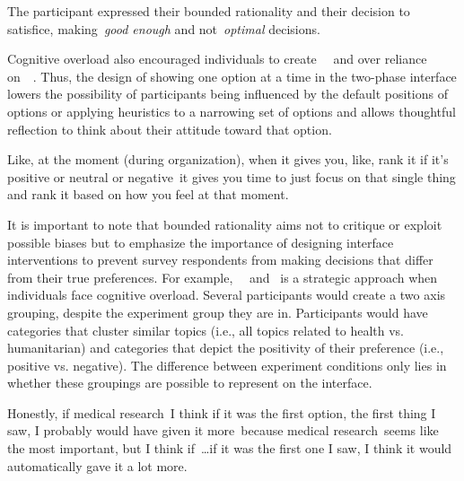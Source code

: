 The participant expressed their bounded rationality and their decision to satisfice, making~\textit{good enough} and not~\textit{optimal} decisions.

Cognitive overload also encouraged individuals to create~\underline{}~\cite{tverskyJudgmentUncertaintyHeuristics1974} and over reliance on~\underline{}~\cite{thalerNudgeImprovingDecisions2008a}. Thus, the design of showing one option at a time in the two-phase interface lowers the possibility of participants being influenced by the default positions of options or applying heuristics to a narrowing set of options and allows thoughtful reflection to think about their attitude toward that option.

\begin{displayquote}
Like, at the moment (during organization), when it gives you, like, rank it if it's positive or neutral or negative~\bracketellipsis it gives you time to just focus on that single thing and rank it based on how you feel at that moment. \hfill{}
\end{displayquote}

It is important to note that bounded rationality aims not to critique or exploit possible biases but to emphasize the importance of designing interface interventions to prevent survey respondents from making decisions that differ from their true preferences. For example,~\underline{}~\cite{simonSciencesArtificial1996} and~\underline{} is a strategic approach when individuals face cognitive overload. Several participants would create a two axis grouping, despite the experiment group they are in. Participants would have categories that cluster similar topics (i.e., all topics related to health vs. humanitarian) and categories that depict the positivity of their preference (i.e., positive vs. negative). The difference between experiment conditions only lies in whether these groupings are possible to represent on the interface.

\begin{displayquote}
    Honestly, if medical research~\bracketellipsis I think if it was the first option, the first thing I saw, I probably would have given it more~\bracketellipsis because medical research~\bracketellipsis seems like the most important, but I think if~\ldots if it was the first one I saw, I think it would automatically gave it a lot more. \hfill{}
\end{displayquote}

